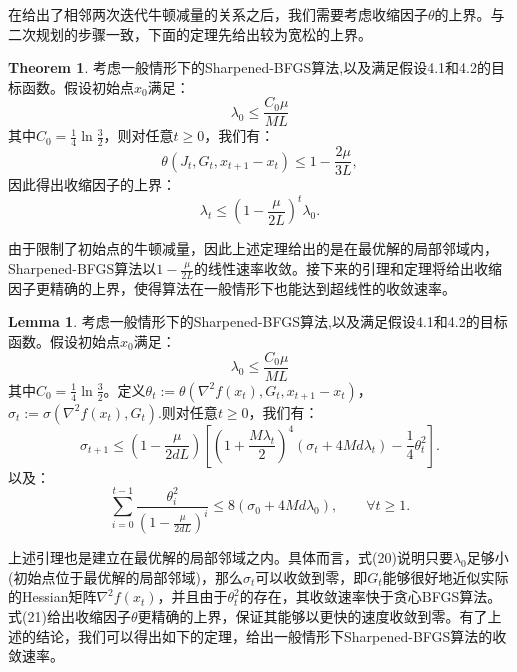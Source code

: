\documentclass[a4paper,twoside,AutoFakeBold]{article}
\theoremstyle{definition}
\newtheorem{thrm2}{{Theorem}}
\newtheorem{lema2}{{Lemma}}
\begin{document}
在给出了相邻两次迭代牛顿减量的关系之后，我们需要考虑收缩因子$\theta$的上界。与二次规划的步骤一致，下面的定理先给出较为宽松的上界。

\begin{thrm2}
    考虑一般情形下的Sharpened-BFGS算法,以及满足假设4.1和4.2的目标函数。假设初始点$x_0$满足：
    \begin{equation}
        \lambda_0\le\frac{C_0\mu}{ML}
    \end{equation}
    其中$C_0 = \frac{1}{4}\ln{\frac{3}{2}}$，则对任意$t\ge 0$，我们有：
    \begin{equation}
        \theta(J_t, G_t, x_{t + 1} - x_{t}) \leq 1 - \frac{2\mu}{3L},
    \end{equation}
    因此得出收缩因子的上界：
    \begin{equation}
        \lambda_t \leq (1 - \frac{\mu}{2L})^{t}\lambda_0.
    \end{equation}
\end{thrm2}

由于限制了初始点的牛顿减量，因此上述定理给出的是在最优解的局部邻域内，Sharpened-BFGS算法以$1-\frac{\mu}{2L}$的线性速率收敛。接下来的引理和定理将给出收缩因子更精确的上界，使得算法在一般情形下也能达到超线性的收敛速率。

\begin{lema2}
    考虑一般情形下的Sharpened-BFGS算法,以及满足假设4.1和4.2的目标函数。假设初始点$x_0$满足：
    \begin{equation}
        \lambda_0\le\frac{C_0\mu}{ML}
    \end{equation}
    其中$C_0 = \frac{1}{4}\ln{\frac{3}{2}}$。定义$\theta_t := \theta(\nabla^2{f(x_{t})}, G_t, x_{t + 1} - x_{t})$，$\sigma_t := \sigma(\nabla^2{f(x_{t})}, G_{t})$.则对任意$t\ge 0$，我们有：
    \begin{equation}
        \sigma_{t+1} \leq (1 - \frac{\mu}{2dL})\left[(1 + \frac{M\lambda_t}{2})^4(\sigma_t + 4Md\lambda_t) - \frac{1}{4}\theta^2_t\right].
    \end{equation}
    以及：
    \begin{equation}
        \sum_{i = 0}^{t - 1}\frac{\theta^2_i}{(1 - \frac{\mu}{2d L})^{i}}  \leq 8(\sigma_0 + 4Md\lambda_0), \qquad \forall t \geq 1. 
    \end{equation}
\end{lema2}

上述引理也是建立在最优解的局部邻域之内。具体而言，式(20)说明只要$\lambda_0$足够小(初始点位于最优解的局部邻域)，那么$\sigma_t$可以收敛到零，即$G_t$能够很好地近似实际的Hessian矩阵$\nabla^2 f(x_t)$，并且由于$\theta_t^2$的存在，其收敛速率快于贪心BFGS算法。
式(21)给出收缩因子$\theta$更精确的上界，保证其能够以更快的速度收敛到零。有了上述的结论，我们可以得出如下的定理，给出一般情形下Sharpened-BFGS算法的收敛速率。
\end{document}
